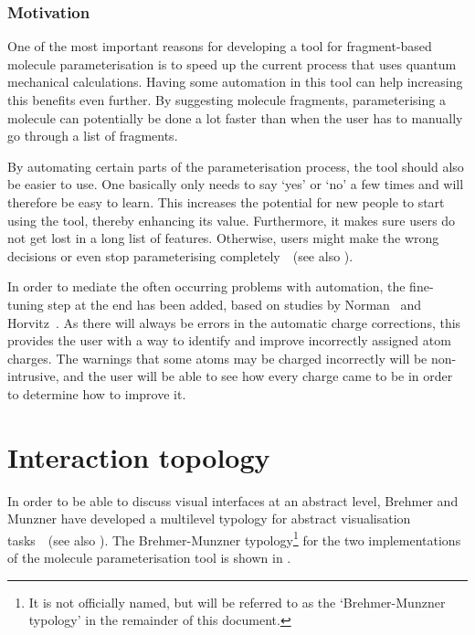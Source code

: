 \subsubsection{Motivation}
One of the most important reasons for developing a tool for fragment-based molecule parameterisation is to speed up the current process that uses quantum mechanical calculations. Having some automation in this tool can help increasing this benefits even further. By suggesting molecule fragments, parameterising a molecule can potentially be done a lot faster than when the user has to manually go through a list of fragments.

By automating certain parts of the parameterisation process, the tool should also be easier to use. One basically only needs to say `yes' or `no' a few times and will therefore be easy to learn. This increases the potential for new people to start using the tool, thereby enhancing its value. Furthermore, it makes sure users do not get lost in a long list of features. Otherwise, users might make the wrong decisions or even stop parameterising completely~\cite{norman2002design}~(see also ).

In order to mediate the often occurring problems with automation, the fine-tuning step at the end has been added, based on studies by Norman~\cite{norman1990problem} and Horvitz~\cite{horvitz1999principles}. As there will always be errors in the automatic charge corrections, this provides the user with a way to identify and improve incorrectly assigned atom charges. The warnings that some atoms may be charged incorrectly will be non-intrusive, and the user will be able to see how every charge came to be in order to determine how to improve it.


\section{Interaction topology}
In order to be able to discuss visual interfaces at an abstract level, Brehmer and Munzner have developed a multilevel typology for abstract visualisation tasks~\cite{brehmer2013multi}~(see also ). The Brehmer-Munzner typology\footnote{It is not officially named, but will be referred to as the `Brehmer-Munzner typology' in the remainder of this document.} for the two implementations of the molecule parameterisation tool is shown in .

